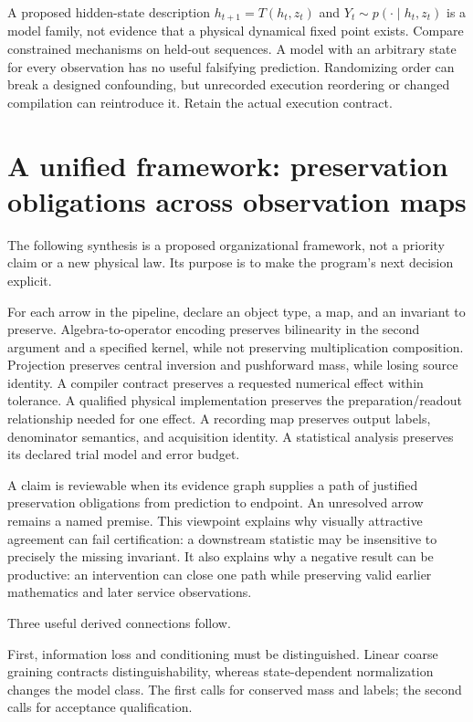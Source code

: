 \documentclass[11pt,a4paper]{article}
\begin{document}
A proposed hidden-state description $h_{t+1}=T(h_t,z_t)$ and $Y_t\sim p(\cdot\mid h_t,z_t)$ is a model family, not evidence that a physical dynamical fixed point exists. Compare constrained mechanisms on held-out sequences. A model with an arbitrary state for every observation has no useful falsifying prediction. Randomizing order can break a designed confounding, but unrecorded execution reordering or changed compilation can reintroduce it. Retain the actual execution contract.

\section{A unified framework: preservation obligations across observation maps}
The following synthesis is a proposed organizational framework, not a priority claim or a new physical law. Its purpose is to make the program's next decision explicit.

For each arrow in the pipeline, declare an object type, a map, and an invariant to preserve. Algebra-to-operator encoding preserves bilinearity in the second argument and a specified kernel, while not preserving multiplication composition. Projection preserves central inversion and pushforward mass, while losing source identity. A compiler contract preserves a requested numerical effect within tolerance. A qualified physical implementation preserves the preparation/readout relationship needed for one effect. A recording map preserves output labels, denominator semantics, and acquisition identity. A statistical analysis preserves its declared trial model and error budget.

A claim is reviewable when its evidence graph supplies a path of justified preservation obligations from prediction to endpoint. An unresolved arrow remains a named premise. This viewpoint explains why visually attractive agreement can fail certification: a downstream statistic may be insensitive to precisely the missing invariant. It also explains why a negative result can be productive: an intervention can close one path while preserving valid earlier mathematics and later service observations.

Three useful derived connections follow.

First, information loss and conditioning must be distinguished. Linear coarse graining contracts distinguishability, whereas state-dependent normalization changes the model class. The first calls for conserved mass and labels; the second calls for acceptance qualification.
\end{document}
